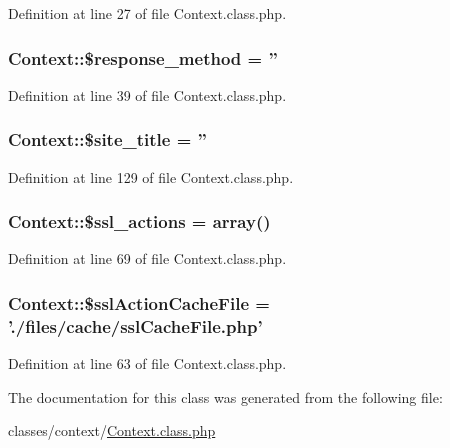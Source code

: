 Definition at line 27 of file Context.\-class.\-php.

\hypertarget{classContext_a383836fb81ee24d673c7145e4d2eb030}{
\subsubsection[{\$response\-\_\-method}]{\setlength{\rightskip}{0pt plus 5cm}Context\-::\$response\-\_\-method = ''}}\label{classContext_a383836fb81ee24d673c7145e4d2eb030}


Definition at line 39 of file Context.\-class.\-php.

\hypertarget{classContext_a3663ad0bbcb194dbb5766db96c9ecefb}{
\subsubsection[{\$site\-\_\-title}]{\setlength{\rightskip}{0pt plus 5cm}Context\-::\$site\-\_\-title = ''}}\label{classContext_a3663ad0bbcb194dbb5766db96c9ecefb}


Definition at line 129 of file Context.\-class.\-php.

\hypertarget{classContext_a9f8d33aa42d3851da1134d3ba2fbf009}{
\subsubsection[{\$ssl\-\_\-actions}]{\setlength{\rightskip}{0pt plus 5cm}Context\-::\$ssl\-\_\-actions = array()}}\label{classContext_a9f8d33aa42d3851da1134d3ba2fbf009}


Definition at line 69 of file Context.\-class.\-php.

\hypertarget{classContext_a5554b6376a0703ebfbdf2bf79800bfee}{
\subsubsection[{\$ssl\-Action\-Cache\-File}]{\setlength{\rightskip}{0pt plus 5cm}Context\-::\$ssl\-Action\-Cache\-File = './files/cache/ssl\-Cache\-File.\-php'}}\label{classContext_a5554b6376a0703ebfbdf2bf79800bfee}


Definition at line 63 of file Context.\-class.\-php.



The documentation for this class was generated from the following file\-:\begin{DoxyCompactItemize}
\item 
classes/context/\hyperlink{Context_8class_8php}{Context.\-class.\-php}\end{DoxyCompactItemize}
